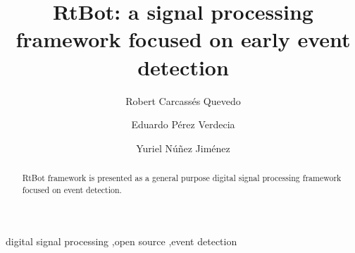 \documentclass[preprint,1p,times]{elsarticle}
\begin{document}
\begin{frontmatter}



\title{RtBot: a signal processing framework focused on early event detection}


\author{Robert Carcassés Quevedo}
\author{Eduardo Pérez Verdecia}
\author{Yuriel Núñez Jiménez}


\begin{abstract}
RtBot framework is presented as a general purpose digital signal processing
framework focused on event detection.
\end{abstract}


\begin{keyword}
digital signal processing \sep open source \sep event detection
\end{keyword}

\end{frontmatter}
\end{document}
